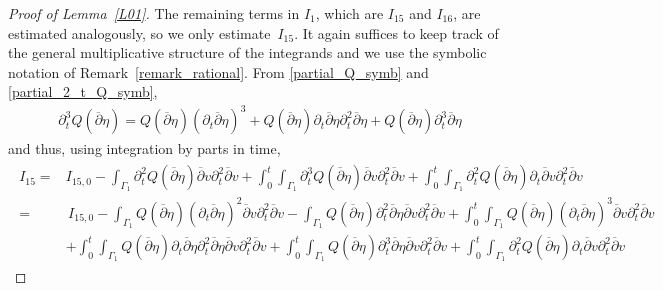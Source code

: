 \documentclass[10pt,reqno]{amsart}
\makeatletter
\theoremstyle{plain}
\theoremstyle{definition}
\numberwithin{equation}{section}
\newcommand{\Ga}{\Gamma}
\def\paragraph{\@startsection{paragraph}{4}%
  \z@\z@{-\fontdimen2\font}%
  {\normalfont\it}}
\makeatother
\begin{document}
\begin{proof}[Proof of Lemma~\ref{L01}]
The remaining terms in $I_{1}$, which are 
$I_{15}$ and $I_{16}$, are estimated analogously, so we only
estimate~$I_{15}$.
It again suffices
to keep track of the general multiplicative structure of the integrands and
we use the symbolic notation of Remark~\ref{remark_rational}.
From \eqref{partial_Q_symb} and  \eqref{partial_2_t_Q_symb},
\begin{gather}
\partial^3_t Q(\overline{\partial} \eta) = Q( \overline{\partial} \eta) 
(\partial_t \overline{\partial} \eta)^3 + 
Q(\overline{\partial} \eta) \partial_t \overline{\partial}\eta
\partial^2_t \overline{\partial} \eta 
+ Q( \overline{\partial} \eta) 
\partial^3_t \overline{\partial} \eta
\label{partial_3_t_Q_symb}
\end{gather}
and thus, using integration by parts in time,
\begin{align}
\begin{split}
I_{15}  = & 
I_{15,0}
- \int_{\Ga_1} \partial^2_t Q(\overline{\partial} \eta) \overline{\partial} v
\partial^2_t \overline{\partial} v 
+ \int_0^t \int_{\Ga_1} \partial^3_t Q(\overline{\partial} \eta)
\overline{\partial}v \partial^2_t \overline{\partial} v
+ \int_0^t \int_{\Ga_1} \partial^2_t Q(\overline{\partial} \eta) \partial_t \overline{\partial} v \partial^2_t \overline{\partial} v
\\
= & \, 
I_{15,0}
- \int_{\Ga_1}Q(\overline{\partial} \eta) 
(\partial_t \overline{\partial} \eta)^2
\overline{\partial} v
\partial^2_t \overline{\partial} v  
- \int_{\Ga_1}Q(\overline{\partial} \eta) 
\partial^2_t \overline{\partial} \eta
\overline{\partial} v
\partial^2_t \overline{\partial} v
+ \int_0^t \int_{\Ga_1} Q(\overline{\partial} \eta)  (\partial_t \overline{\partial} \eta)^3
\overline{\partial} v
\partial^2_t \overline{\partial} v
\\
&
+ \int_0^t \int_{\Ga_1} Q(\overline{\partial} \eta) \partial_t \overline{\partial}\eta
\partial^2_t \overline{\partial} \eta
\overline{\partial} v
\partial^2_t \overline{\partial} v
+ \int_0^t \int_{\Ga_1} Q( \overline{\partial} \eta) 
\partial^3_t \overline{\partial} \eta
\overline{\partial} v
\partial^2_t \overline{\partial} v
+
\int_0^t \int_{\Ga_1} \partial^2_t Q(\overline{\partial} \eta) \partial_t \overline{\partial} v \partial^2_t \overline{\partial} v

\end{split}
\end{align}
\end{proof}
\end{document}
